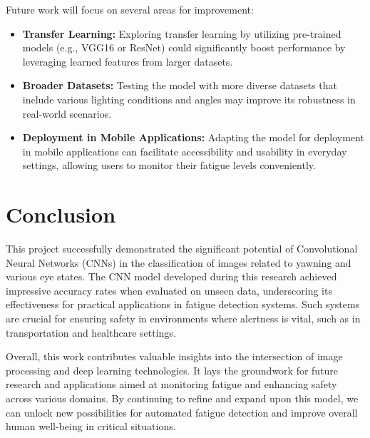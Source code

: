 \documentclass[conference]{IEEEtran}
\begin{document}
Future work will focus on several areas for improvement:

\begin{itemize}
    
    \item \textbf{Transfer Learning:} Exploring transfer learning by utilizing pre-trained models (e.g., VGG16 or ResNet) could significantly boost performance by leveraging learned features from larger datasets.
    
    \item \textbf{Broader Datasets:} Testing the model with more diverse datasets that include various lighting conditions and angles may improve its robustness in real-world scenarios.

    \item \textbf{Deployment in Mobile Applications:} Adapting the model for deployment in mobile applications can facilitate accessibility and usability in everyday settings, allowing users to monitor their fatigue levels conveniently.
\end{itemize}




\section{Conclusion}
This project successfully demonstrated the significant potential of Convolutional Neural Networks (CNNs) in the classification of images related to yawning and various eye states. The CNN model developed during this research achieved impressive accuracy rates when evaluated on unseen data, underscoring its effectiveness for practical applications in fatigue detection systems. Such systems are crucial for ensuring safety in environments where alertness is vital, such as in transportation and healthcare settings.

Overall, this work contributes valuable insights into the intersection of image processing and deep learning technologies. It lays the groundwork for future research and applications aimed at monitoring fatigue and enhancing safety across various domains. By continuing to refine and expand upon this model, we can unlock new possibilities for automated fatigue detection and improve overall human well-being in critical situations.
\end{document}
